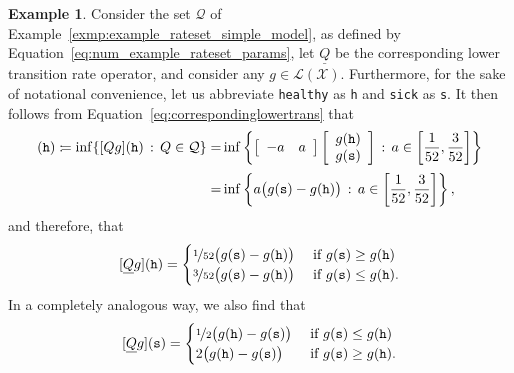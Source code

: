 \documentclass[10pt,a4paper]{paper}
\theoremstyle{definition}
\newtheorem{exmp}{Example}%
\newcommand{\states}{\mathcal{X}}
\newcommand{\gambles}{\mathcal{L}}
\newcommand{\gamblesX}{\gambles(\states)}
\newcommand{\rateset}{\mathcal{Q}}
\newcommand{\lrate}{\underline{Q}}
\newcommand{\coloneqq}{:\!=}
\begin{document}
\begin{exmp}\label{exmp:numerical_lrate}
Consider the set $\rateset$ of Example~\ref{exmp:example_rateset_simple_model}, as defined by Equation~\eqref{eq:num_example_rateset_params}, let $\lrate$ be the corresponding lower transition rate operator, and consider any $g\in\gamblesX$. Furthermore, for the sake of notational convenience, let us abbreviate {\tt healthy} as {\tt h} and {\tt sick} as {\tt s}. It then follows from Equation~\eqref{eq:correspondinglowertrans} that
\begin{align*}
[\lrate g](\text{{\tt h}})
\coloneqq
\inf\{[Qg](\text{{\tt h}})\,:\,Q\in\rateset\}
=&
\inf\left\{\left[\begin{array}{rr}-a & a \end{array}\right]\left[\begin{array}{l} g(\text{{\tt h}}) \\ g(\text{{\tt s}}) \end{array}\right]\,:\,a\in\left[\frac{1}{52}, \frac{3}{52} \right]\right\} \\[2pt]
=&\inf\left\{a\big(g(\text{{\tt s}})-g(\text{{\tt h}})\big)\,:\,a\in\left[\frac{1}{52}, \frac{3}{52} \right]\right\},
\vspace{-6pt}
\end{align*}
and therefore, that
\begin{equation}\label{eq:lratehealthexample:h}
[\lrate g](\text{{\tt h}})
=
\begin{cases}
\nicefrac{1}{52}\big(g(\text{{\tt s}})-g(\text{{\tt h}})\big)
&\text{ if $g(\text{{\tt s}})\geq g(\text{{\tt h}})$}\\
\nicefrac{3}{52}\big(g(\text{{\tt s}})-g(\text{{\tt h}})\big)
&\text{ if $g(\text{{\tt s}})\leq g(\text{{\tt h}})$}.
\end{cases}
\end{equation}
In a completely analogous way, we also find that
\begin{equation}\label{eq:lratehealthexample:s}
[\lrate g](\text{{\tt s}})
=
\begin{cases}
\nicefrac{1}{2}\big(g(\text{{\tt h}})-g(\text{{\tt s}})\big)
&\text{ if $g(\text{{\tt s}})\leq g(\text{{\tt h}})$}\\
2\big(g(\text{{\tt h}})-g(\text{{\tt s}})\big)
&\text{ if $g(\text{{\tt s}})\geq g(\text{{\tt h}})$}.
\end{cases}
\end{equation}

\end{exmp}
\end{document}
